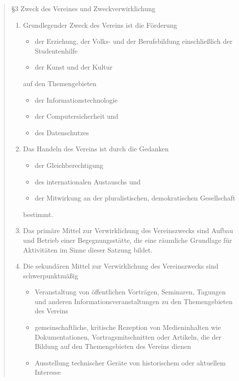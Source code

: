 \documentclass{scrartcl}
\begin{document}
\begin{quote}
	
	§3 Zweck des Vereines und Zweckverwirklichung
\begin{enumerate}
	\item Grundlegender Zweck des Vereins ist die Förderung
		\begin{itemize}
			\item der Erziehung, der Volks- und der Berufsbildung einschließlich
				  der Studentenhilfe
			\item der Kunst und der Kultur
		\end{itemize}
		auf den Themengebieten
		\begin{itemize}
			\item der Informationstechnologie
			\item der Computersicherheit und
			\item des Datenschutzes
		\end{itemize}

	\item Das Handeln des Vereins ist durch die Gedanken
		\begin{itemize}
			\item der Gleichberechtigung
			\item des internationalen Austauschs und
			\item der Mitwirkung an der pluralistischen, demokratischen
				Gesellschaft
		\end{itemize}
		bestimmt.

	\item Das primäre Mittel zur Verwirklichung des Vereinszwecks sind
		Aufbau und Betrieb einer Begegnungsstätte, die eine räumliche
		Grundlage für Aktivitäten im Sinne dieser Satzung bildet.

	\item Die sekundären Mittel zur Verwirklichung des Vereinszwecks sind
		schwerpunktmäßig

	\begin{itemize}
		\item Veranstaltung von öffentlichen Vorträgen, Seminaren, Tagungen und
			anderen Informationsveranstaltungen zu den Themengebieten
			des Vereins

		\item gemeinschaftliche, kritische Rezeption von Medieninhalten
			wie Dokumentationen, Vortragsmitschnitten oder Artikeln, die der
			Bildung auf den Themengebieten des Vereins dienen

		\item Ausstellung technischer Geräte von historischem oder aktuellem
			Interesse


\end{itemize}
\end{enumerate}
\end{quote}
\end{document}
